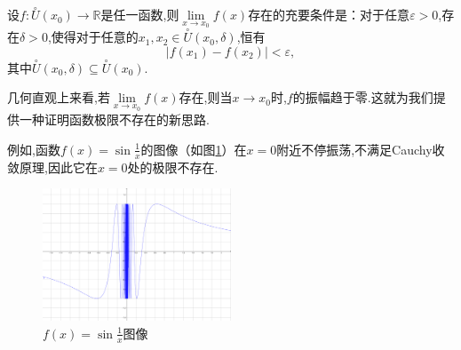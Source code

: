 	\begin{theorem}
		设$f:\overset{\circ}{U}(x_0)\to \mathbb{R}$是任一函数,则$\lim\limits_{x\to x_0}f(x)$存在的充要条件是：对于任意$\varepsilon>0$,存在$\delta>0$,使得对于任意的$x_1,x_2\in \overset{\circ}{U}(x_0,\delta)$,恒有
		\[
		\left|f(x_1)-f(x_2)\right|<\varepsilon,
		\]
		其中$\overset{\circ}{U}(x_0,\delta)\subseteq\overset{\circ}{U}(x_0)$.
	\end{theorem}
	几何直观上来看,若$\lim\limits_{x\to x_0}f(x)$存在,则当$x\to x_0$时,$f$的振幅趋于零.这就为我们提供一种证明函数极限不存在的新思路.
	
	例如,函数$f(x)=\sin\frac{1}{x}$的图像（如图\ref{sinfun}）在$x=0$附近不停振荡,不满足Cauchy收敛原理,因此它在$x=0$处的极限不存在.
	\begin{figure}[H]
		\centering
		\includegraphics[width=0.5\textwidth]{figures/sinfun}
		\caption{$f(x)=\sin\frac{1}{x}$图像}\label{sinfun}
	\end{figure}